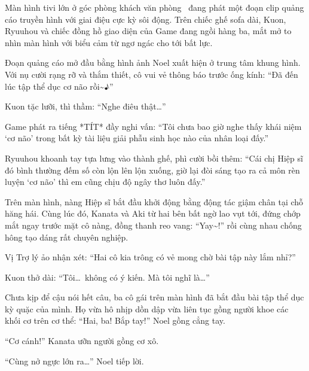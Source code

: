 \documentclass[../main.tex]{subfiles}
\begin{document}

Màn hình tivi lớn ở góc phòng khách văn phòng \hll\ đang phát một đoạn clip quảng cáo truyền hình với giai điệu cực kỳ sôi động. Trên chiếc ghế sofa dài, Kuon, Ryuuhou và chiếc đồng hồ giao diện của Game đang ngồi hàng ba, mắt mở to nhìn màn hình với biểu cảm từ ngơ ngác cho tới bất lực.

Đoạn quảng cáo mở đầu bằng hình ảnh Noel xuất hiện ở trung tâm khung hình. Với nụ cười rạng rỡ và thắm thiết, cô vui vẻ thông báo trước ống kính: ``Đã đến lúc tập thể dục cơ não rồi\~{}♪''

Kuon tặc lưỡi, thì thầm: ``Nghe điêu thật\dots''

Game phát ra tiếng *TÍT* đầy nghi vấn: ``Tôi chưa bao giờ nghe thấy khái niệm `cơ não' trong bất kỳ tài liệu giải phẫu sinh học nào của nhân loại đấy.''

Ryuuhou khoanh tay tựa lưng vào thành ghế, phì cười bồi thêm: ``Cái chị Hiệp sĩ đó bình thường đếm số còn lộn lên lộn xuống, giờ lại đòi sáng tạo ra cả môn rèn luyện `cơ não' thì em cũng chịu độ ngây thơ luôn đấy.''

Trên màn hình, nàng Hiệp sĩ bắt đầu khởi động bằng động tác giậm chân tại chỗ hăng hái. Cùng lúc đó, Kanata và Aki từ hai bên bất ngờ lao vụt tới, đứng chớp mắt ngay trước mặt cô nàng, đồng thanh reo vang: ``Yay\~{}!'' rồi cùng nhau chống hông tạo dáng rất chuyên nghiệp.


Vị Trợ lý ảo nhận xét: ``Hai cô kia trông có vẻ mong chờ bài tập này lắm nhỉ?''

Kuon thở dài: ``Tôi\dots\ không có ý kiến. Mà tôi nghĩ là\dots''

Chưa kịp để cậu nói hết câu, ba cô gái trên màn hình đã bắt đầu bài tập thể dục kỳ quặc của mình. Họ vừa hô nhịp dồn dập vừa liên tục gồng người khoe các khối cơ trên cơ thể: ``Hai, ba! Bắp tay!'' Noel gồng cẳng tay.

``Cơ cánh!'' Kanata ưỡn người gồng cơ xô.

``Cùng nở ngực lớn ra\dots'' Noel tiếp lời.
\end{document}
